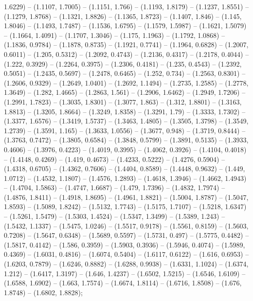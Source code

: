 1.6229) -- (1.1107, 1.7005) -- (1.1151, 1.766) -- (1.1193, 1.8179) -- (1.1237, 1.8551) -- (1.1279, 1.8768) -- (1.1321, 1.8826) -- (1.1365, 1.8723) -- (1.1407, 1.846) -- (1.145, 1.8046) -- (1.1493, 1.7487) -- (1.1536, 1.6795) -- (1.1579, 1.5987) -- (1.1621, 1.5079) -- (1.1664, 1.4091) -- (1.1707, 1.3046) -- (1.175, 1.1963) -- (1.1792, 1.0868) -- (1.1836, 0.9784) -- (1.1878, 0.8735) -- (1.1921, 0.7741) -- (1.1964, 0.6828) -- (1.2007, 0.6011) -- (1.205, 0.5312) -- (1.2092, 0.4743) -- (1.2136, 0.4317) -- (1.2178, 0.4044) -- (1.222, 0.3929) -- (1.2264, 0.3975) -- (1.2306, 0.4181) -- (1.235, 0.4543) -- (1.2392, 0.5051) -- (1.2435, 0.5697) -- (1.2478, 0.6465) -- (1.252, 0.734) -- (1.2563, 0.8301) -- (1.2606, 0.9329) -- (1.2649, 1.0401) -- (1.2692, 1.1494) -- (1.2735, 1.2585) -- (1.2778, 1.3649) -- (1.282, 1.4665) -- (1.2863, 1.561) -- (1.2906, 1.6462) -- (1.2949, 1.7206) -- (1.2991, 1.7823) -- (1.3035, 1.8301) -- (1.3077, 1.863) -- (1.312, 1.8801) -- (1.3163, 1.8813) -- (1.3205, 1.8664) -- (1.3249, 1.8358) -- (1.3291, 1.79) -- (1.3333, 1.7302) -- (1.3377, 1.6576) -- (1.3419, 1.5737) -- (1.3463, 1.4805) -- (1.3505, 1.3798) -- (1.3549, 1.2739) -- (1.3591, 1.165) -- (1.3633, 1.0556) -- (1.3677, 0.948) -- (1.3719, 0.8444) -- (1.3763, 0.7472) -- (1.3805, 0.6584) -- (1.3848, 0.5799) -- (1.3891, 0.5135) -- (1.3933, 0.4606) -- (1.3976, 0.4223) -- (1.4019, 0.3995) -- (1.4062, 0.3926) -- (1.4104, 0.4018) -- (1.4148, 0.4269) -- (1.419, 0.4673) -- (1.4233, 0.5222) -- (1.4276, 0.5904) -- (1.4318, 0.6705) -- (1.4362, 0.7606) -- (1.4404, 0.8589) -- (1.4448, 0.9632) -- (1.449, 1.0712) -- (1.4532, 1.1807) -- (1.4576, 1.2893) -- (1.4618, 1.3946) -- (1.4662, 1.4943) -- (1.4704, 1.5863) -- (1.4747, 1.6687) -- (1.479, 1.7396) -- (1.4832, 1.7974) -- (1.4876, 1.8411) -- (1.4918, 1.8695) -- (1.4961, 1.8821) -- (1.5004, 1.8787) -- (1.5047, 1.8593) -- (1.5089, 1.8242) -- (1.5132, 1.7743) -- (1.5175, 1.7107) -- (1.5218, 1.6347) -- (1.5261, 1.5479) -- (1.5303, 1.4524) -- (1.5347, 1.3499) -- (1.5389, 1.243) -- (1.5432, 1.1337) -- (1.5475, 1.0246) -- (1.5517, 0.9178) -- (1.5561, 0.8159) -- (1.5603, 0.7208) -- (1.5647, 0.6348) -- (1.5689, 0.5597) -- (1.5731, 0.497) -- (1.5775, 0.4482) -- (1.5817, 0.4142) -- (1.586, 0.3959) -- (1.5903, 0.3936) -- (1.5946, 0.4074) -- (1.5989, 0.4369) -- (1.6031, 0.4816) -- (1.6074, 0.5404) -- (1.6117, 0.6122) -- (1.616, 0.6953) -- (1.6203, 0.7879) -- (1.6246, 0.8882) -- (1.6288, 0.9938) -- (1.6331, 1.1024) -- (1.6374, 1.212) -- (1.6417, 1.3197) -- (1.646, 1.4237) -- (1.6502, 1.5215) -- (1.6546, 1.6109) -- (1.6588, 1.6902) -- (1.663, 1.7574) -- (1.6674, 1.8114) -- (1.6716, 1.8508) -- (1.676, 1.8748) -- (1.6802, 1.8828);



